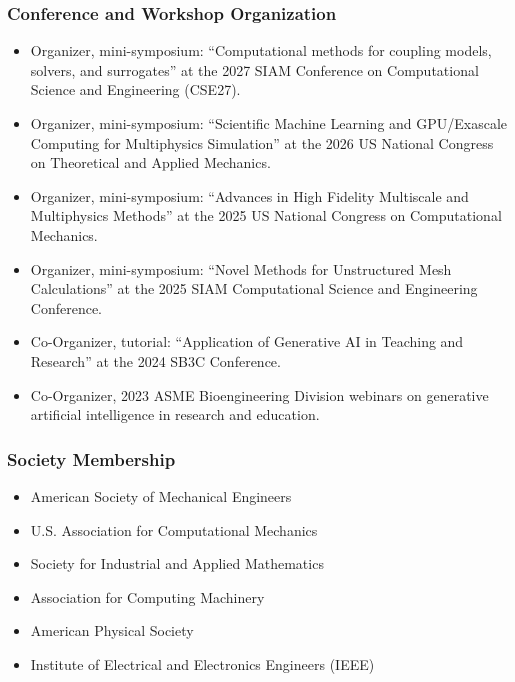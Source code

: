\subsubsection{Conference and Workshop Organization}

\begin{itemize}
\item Organizer, mini-symposium: ``Computational methods for coupling models, solvers, and surrogates'' at the 2027 SIAM Conference on Computational Science and Engineering (CSE27).
\item Organizer, mini-symposium: ``Scientific Machine Learning and GPU/Exascale Computing for Multiphysics Simulation'' at the 2026 US National Congress on Theoretical and Applied Mechanics.
\item Organizer, mini-symposium: ``Advances in High Fidelity Multiscale and Multiphysics Methods'' at the 2025 US National Congress on Computational Mechanics.
\item Organizer, mini-symposium: ``Novel Methods for Unstructured Mesh Calculations'' at the 2025 SIAM Computational Science and Engineering Conference.
\item Co-Organizer, tutorial: ``Application of Generative AI in Teaching and Research'' at the 2024 SB3C Conference.
\item Co-Organizer, 2023 ASME Bioengineering Division webinars on generative artificial intelligence in research and education.
\end{itemize}


\subsubsection{Society Membership}

\begin{itemize}
\item American Society of Mechanical Engineers
\item U.S. Association for Computational Mechanics
\item Society for Industrial and Applied Mathematics
\item Association for Computing Machinery
\item American Physical Society
\item Institute of Electrical and Electronics Engineers (IEEE)
\end{itemize}
